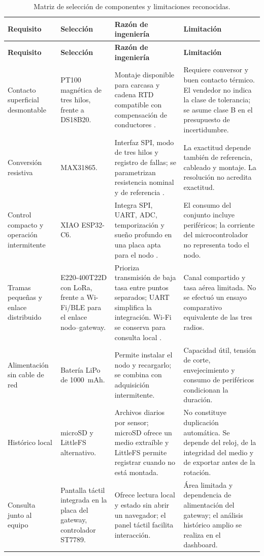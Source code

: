 \begingroup
\small\singlespacing
\setlength{\tabcolsep}{3pt}
\begin{longtable}{@{}>{\raggedright\arraybackslash}p{2.6cm}>{\raggedright\arraybackslash}p{2.7cm}>{\raggedright\arraybackslash}p{4.65cm}>{\raggedright\arraybackslash}p{4.65cm}@{}}
\caption{Matriz de selección de componentes y limitaciones reconocidas.}\label{tab:seleccion-componentes}\\
\toprule
\textbf{Requisito} & \textbf{Selección} & \textbf{Razón de ingeniería} & \textbf{Limitación} \\
\midrule\endfirsthead
\toprule
\textbf{Requisito} & \textbf{Selección} & \textbf{Razón de ingeniería} & \textbf{Limitación} \\
\midrule\endhead
\bottomrule\endfoot
Contacto superficial desmontable & PT100 magnética de tres hilos, frente a DS18B20. & Montaje disponible para carcasa y cadena RTD compatible con compensación de conductores \citep{iec60751,max31865}. & Requiere conversor y buen contacto térmico. El vendedor no indica la clase de tolerancia; se asume clase B en el presupuesto de incertidumbre. \\
Conversión resistiva & MAX31865. & Interfaz SPI, modo de tres hilos y registro de fallas; se parametrizan resistencia nominal y de referencia \citep{max31865}. & La exactitud depende también de referencia, cableado y montaje. La resolución no acredita exactitud. \\
Control compacto y operación intermitente & XIAO ESP32-C6. & Integra SPI, UART, ADC, temporización y sueño profundo en una placa apta para el nodo \citep{xiaoc6}. & El consumo del conjunto incluye periféricos; la corriente del microcontrolador no representa todo el nodo. \\
Tramas pequeñas y enlace distribuido & E220-400T22D con LoRa, frente a Wi-Fi/BLE para el enlace nodo--gateway. & Prioriza transmisión de baja tasa entre puntos separados; UART simplifica la integración. Wi-Fi se conserva para consulta local \citep{centenaro2016}. & Canal compartido y tasa aérea limitada. No se efectuó un ensayo comparativo equivalente de las tres radios. \\
Alimentación sin cable de red & Batería LiPo de 1000~mAh. & Permite instalar el nodo y recargarlo; se combina con adquisición intermitente. & Capacidad útil, tensión de corte, envejecimiento y consumo de periféricos condicionan la duración. \\
Histórico local & microSD y LittleFS alternativo. & Archivos diarios por sensor; microSD ofrece un medio extraíble y LittleFS permite registrar cuando no está montada. & No constituye duplicación automática. Se depende del reloj, de la integridad del medio y de exportar antes de la rotación. \\
Consulta junto al equipo & Pantalla táctil integrada en la placa del gateway, controlador ST7789. & Ofrece lectura local y estado sin abrir un navegador; el panel táctil facilita interacción. & Área limitada y dependencia de alimentación del gateway; el análisis histórico amplio se realiza en el dashboard. \\
\end{longtable}
\endgroup

